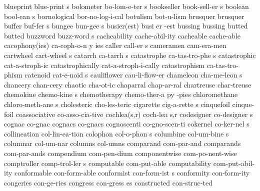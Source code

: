 \5 blueprint		blue-print s
\5 bolometer		bo-lom-e-ter s
\5 bookseller		book-sell-er s		%
\5 boolean		bool-ean s		%
\1 bornological 	bor-no-log-i-cal
\1 botulism		bot-u-lism
\1 brusquer		brusquer
\5 buffer		buf-fer s		%
\5 bungee		bun-gee s		%
\3 busier(est)		busi er -est
\1 bussing		bussing
\1 butted		butted
\5 buzzword		buzz-word s
\1 cacheability 	cache-abil-ity		%
\1 cacheable	 	cache-able		%
\3 cacophony(ies)	ca-coph-o-n y ies
\5 caller		call-er s		%
\1 cameramen		cam-era-men
\5 cartwheel		cart-wheel s
\5 catarrh		ca-tarrh s
\5 catastrophe		ca-tas-tro-phe s	%
\1 catastrophic		cat-a-stroph-ic
\1 catastrophically	cat-a-stroph-i-cally
\1 catastrophism	ca-tas-tro-phism	%
\5 catenoid		cat-e-noid s		%
\1 cauliflower		cau-li-flow-er		%
\NewWordtrue
\5 chameleon		cha-me-leon s		%
\1 chancery		chan-cery		%
\NewWordtrue
\1 chaotic		cha-ot-ic		%
\1 chaparral		chap-ar-ral
\1 chartreuse		char-treuse
\5 chemokine		chemo-kine s		%
\6 chemotherapy 	chemo-ther-a py -pies   %
\5 chloromethane	chloro-meth-ane s	%
\1 cholesteric		cho-les-teric
\5 cigarette		cig-a-rette s
\1 cinquefoil		cinque-foil
\1 coassociative	co-asso-cia-tive	%
\2 cochlea(s,r)		coch-lea s,r		%
\5 codesigner		co-designer s		%
\1 cognac		co-gnac
\1 cognacs		co-gnacs
\NewWordtrue
\1 cognoscenti		co-gno-scen-ti		%
\5 cokernel		co-ker-nel s		%
\1 collineation 	col-lin-ea-tion		%
\NewWordtrue
\5 colophon		col-o-phon s		%
\NewWordtrue
\5 columbine		col-um-bine s		%
\NewWordtrue
\1 columnar		col-um-nar		%
\1 columns              col-umns             %
\1 comparand		com-par-and
\1 comparands		com-par-ands
\1 compendium		com-pen-dium         %
\1 componentwise	com-po-nent-wise     %
\5 comptroller		comp-trol-ler s
\1 computable		com-put-able		%
\1 computability	com-put-abil-ity	%
\1 conformable		con-form-able
\5 conformist		con-form-ist s
\1 conformity		con-form-ity
\1 congeries		con-ge-ries		%
\5 congress		con-gress es
\1 constructed		con-struc-ted		%
